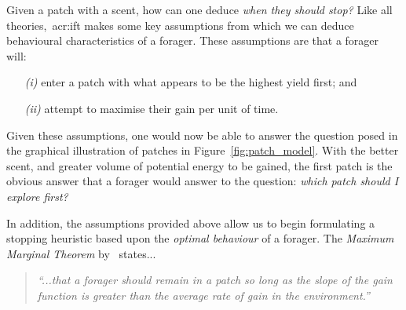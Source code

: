 \noindent
{}
Given a patch with a scent, how can one deduce \emph{when they should stop?} Like all theories,~\gls{acr:ift} makes some key assumptions from which we can deduce behavioural characteristics of a forager. These assumptions are that a forager will:

\begin{itemize}
    \item[\emph{(i)}]{enter a patch with what appears to be the highest yield first; and}
    \item[\emph{(ii)}]{attempt to maximise their gain per unit of time.}
\end{itemize}

Given these assumptions, one would now be able to answer the question posed in the graphical illustration of patches in Figure~\ref{fig:patch_model}. With the better scent, and greater volume of potential energy to be gained, the first patch is the obvious answer that a forager would answer to the question: \emph{which patch should I explore first?}

In addition, the assumptions provided above allow us to begin formulating a stopping heuristic based upon the \emph{optimal behaviour} of a forager. The \emph{Maximum Marginal Theorem} by~\cite{charnov1976mvt} states...

\begin{quote}
    \emph{``...that a forager should remain in a patch so long as the slope of the gain function is greater than the average rate of gain in the environment.''}
\end{quote}


